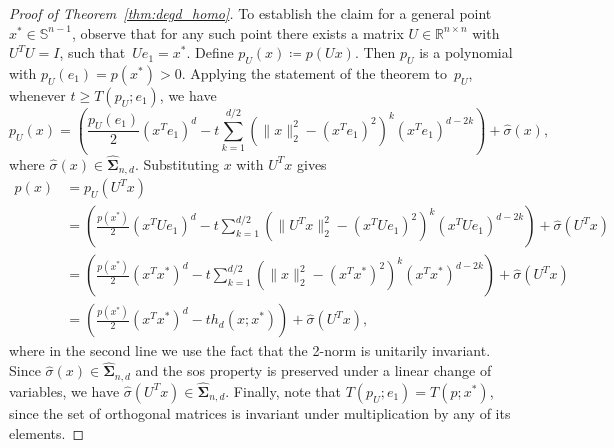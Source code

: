 \documentclass[12pt]{article}
\newcommand{\reals}{\mathbb{R}}
\newcommand{\HSOS}{\widehat{\mathbf{\Sigma}}}
\newcommand{\defeq}{\coloneq}
\newcommand{\mbS}{\mathbb{S}}
\theoremstyle{remark}
\newtheorem{remark}{Remark}%
\begin{document}
\begin{proof}[Proof of Theorem~\ref{thm:degd_homo}]
To establish the claim for a general point $x^*\in \mbS^{n-1}$, observe that for any such point there exists a matrix $U\in\reals^{n\times n}$ with $U^TU=I$, such that~$Ue_1=x^*$. Define $p_U(x)\defeq p(Ux)$. Then $p_U$ is a polynomial with $p_U(e_1)=p(x^*)>0$. Applying the statement of the theorem to~$p_U$, whenever $t\ge T(p_U;e_1)$, we have
\[
p_U(x)=\left(\frac{p_U(e_1)}{2}(x^Te_1)^d-t\sum\limits_{k=1}^{d/2}(\|x\|_2^2-(x^Te_1)^2)^{k}(x^Te_1)^{d-2k}\right)+\hat{\sigma}(x),\]
where $\hat{\sigma}(x)\in\HSOS_{n,d}$.
Substituting $x$ with $U^Tx$ gives
\[\begin{aligned}
p(x)&=p_U(U^Tx)\\
&=\left(\frac{p(x^*)}{2}(x^TUe_1)^d-t\sum\limits_{k=1}^{d/2}(\|U^Tx\|_2^2-(x^TUe_1)^2)^{k}(x^TU  e_1)^{d-2k}\right)+\hat{\sigma}(U^Tx)\\
&=\left(\frac{p(x^*)}{2}(x^Tx^*)^d-t\sum\limits_{k=1}^{d/2}(\|x\|_2^2-(x^Tx^*)^2)^{k}(x^Tx^*)^{d-2k}\right)+\hat{\sigma}(U^Tx)\\
&=\left(\frac{p(x^*)}{2}(x^Tx^*)^d-th_d(x;x^*)\right)+\hat{\sigma}(U^Tx),
\end{aligned}
\]
where in the second line we use the fact that the 2-norm is unitarily invariant. 
Since ${\hat{\sigma}(x)\in\HSOS_{n,d}}$ and the sos property is preserved under a linear change of variables, we have ${\hat{\sigma}(U^Tx)\in\HSOS_{n,d}}$. Finally, note that $T(p_U;e_1)=T(p;x^*)$, since the set of orthogonal matrices is invariant under multiplication by any of its elements.
\end{proof}

\end{document}
